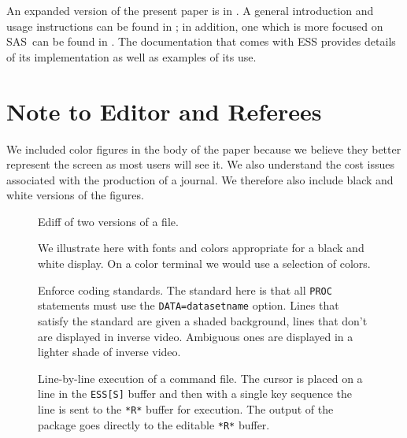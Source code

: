 \documentclass{article}
\newcommand*{\SAS}{\textsc{SAS}}
\newcommand{\stexttt}[1]{{\small\texttt{#1}}}
\begin{document}
An expanded version of the present paper is in \citep{RMHHS:2001}.  A
general introduction and usage instructions can be found in
\citep{heiberger:dsc:2001}; in addition, one which is more focused on
\SAS\ can be found in \citep{heiberger:philasugi:2001}.  The
documentation that comes with ESS provides details of its
implementation as well as examples of its use.


\newpage
\section*{Note to Editor and Referees}
We included color figures in the body of the paper because we believe
they better represent the screen as most users will see it.  We also
understand the cost issues associated with the production of a
journal.  We therefore also include black and white versions of the
figures.

\setcounter{figure}{0}
\begin{figure}[tbp]
  \caption{Ediff of two versions of a file.}
\end{figure}


\begin{figure}[tbp]%
  \caption{We illustrate here with fonts and colors appropriate for a
    black and white display.   On a color terminal we
    would use a selection of colors.}
\end{figure}

\begin{figure}[tbp]
  \caption{Enforce coding standards.  The standard here is
    that all \stexttt{PROC} statements must use the
    \stexttt{DATA=datasetname} option.  Lines that satisfy the
    standard are given a shaded background, lines that don't are displayed
    in inverse video.
    Ambiguous ones are displayed in a lighter shade of inverse video.}
\end{figure}

\begin{figure}[tb]
  \caption{Line-by-line execution of a command file. The cursor is
    placed on a line in the \stexttt{ESS[S]} buffer and then with a single
    key sequence
    the line is sent to the \stexttt{*R*} buffer for
    execution.  The output of the package goes directly to the
    editable \stexttt{*R*} buffer.}
\end{figure}
\end{document}
